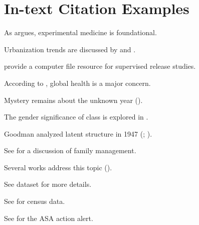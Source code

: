 \documentclass{article}
\begin{document}
\nocite{*} %


\section*{In-text Citation Examples}

As \textcite{bernard1957} argues, experimental medicine is foundational.

Urbanization trends are discussed by \textcite{lee2021a} and \textcite{lee2021b}.

\textcite{deschenes2000} provide a computer file resource for supervised release studies.

According to \textcite{who2022}, global health is a major concern.

Mystery remains about the unknown year (\textcite{doe_nodate}).

The gender significance of class is explored in \textcite{szelenyiForthcoming}.

Goodman analyzed latent structure in 1947 (\textcite{goodman1947a}; \textcite{goodman1947b}).

See \parencite[pp.~63--93]{sampson1992} for a discussion of family management.

Several works address this topic (\parencite{brown2022,kao2003,smith2020a}).

See dataset \textcite{charles1990} for more details.

See \textcite{usbc1960} for census data.

See \textcite{asa1997} for the ASA action alert.


\printbibliography[title={REFERENCES}]
\end{document}
